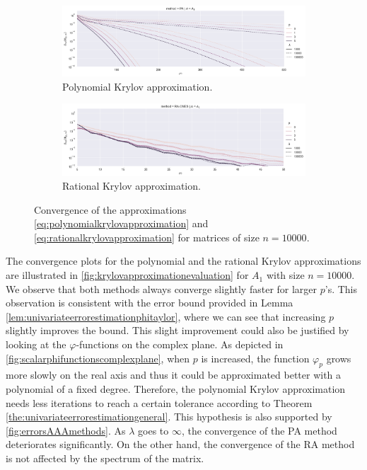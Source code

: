 \begin{figure}[h!]
    \centering
    \begin{subfigure}[b]{.9\textwidth}
        \includegraphics[width=\textwidth]{img/krylovapproximation/cnvg_ps_PA_n1e04.png}
        \caption{Polynomial Krylov approximation.}
        \label{fig:polynomialkrylovapproximationevaluation}
    \end{subfigure}
    \vfill
    \begin{subfigure}[b]{.9\textwidth}
        \includegraphics[width=\textwidth]{img/krylovapproximation/cnvg_ps_RA_n1e04.png}
        \caption{Rational Krylov approximation.}
        \label{fig:rationalkrylovapproximationevaluation}
    \end{subfigure}
    \caption{
        Convergence of the approximations \eqref{eq:polynomialkrylovapproximation}
        and \eqref{eq:rationalkrylovapproximation} for matrices of size $n=10000$.
    }
    \label{fig:krylovapproximationevaluation}
\end{figure}

The convergence plots for the polynomial and the rational Krylov approximations are
illustrated in \autoref{fig:krylovapproximationevaluation} for $A_1$ with size $n=10000$.
We observe that both methods always converge slightly faster for larger $p$'s.
This observation is consistent with the error bound provided in Lemma
\ref{lem:univariateerrorestimationphitaylor}, where we can see that increasing $p$ slightly
improves the bound. This slight improvement could also be justified by looking at the
$\varphi$-functions on the complex plane. As depicted in
\autoref{fig:scalarphifunctionscomplexplane}, when $p$ is increased, the
function $\varphi_p$ grows more slowly on the real axis and thus it could be approximated
better with a polynomial of a fixed degree.
Therefore, the polynomial Krylov approximation needs less iterations to reach a certain tolerance according
to Theorem \ref{the:univariateerrorestimationgeneral}.
This hypothesis is also supported by \autoref{fig:errorsAAAmethods}.
As $\lambda$ goes to $\infty$, the convergence of the PA method deteriorates significantly.
On the other hand, the convergence of the RA method is not affected by the spectrum
of the matrix.

